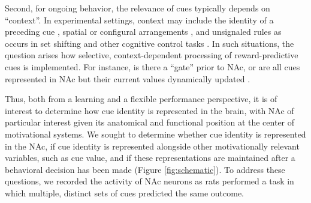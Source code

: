 \documentclass[11pt]{article}
\let\cite=\citep
\begin{document}
Second, for ongoing behavior, the relevance of cues typically depends on “context”. In experimental settings, context may include the identity of a preceding cue \cite{Holland1992}, spatial or configural arrangements \cite{Honey2014}, and unsignaled rules as occurs in set shifting and other cognitive control tasks \cite{Grant1948}. In such situations, the question arises how selective, context-dependent processing of reward-predictive cues is implemented. For instance, is there a “gate” prior to NAc, or are all cues represented in NAc but their current values dynamically updated \cite{Fitzgerald2014,Sleezer2016}.

Thus, both from a learning and a flexible performance perspective, it is of interest to determine how cue identity is represented in the brain, with NAc of particular interest given its anatomical and functional position at the center of motivational systems. We sought to determine whether cue identity is represented in the NAc, if cue identity is represented alongside other motivationally relevant variables, such as cue value, and if these representations are maintained after a behavioral decision has been made (Figure \ref{fig:schematic}). To address these questions, we recorded the activity of NAc neurons as rats performed a task in which multiple, distinct sets of cues predicted the same outcome.
\end{document}
